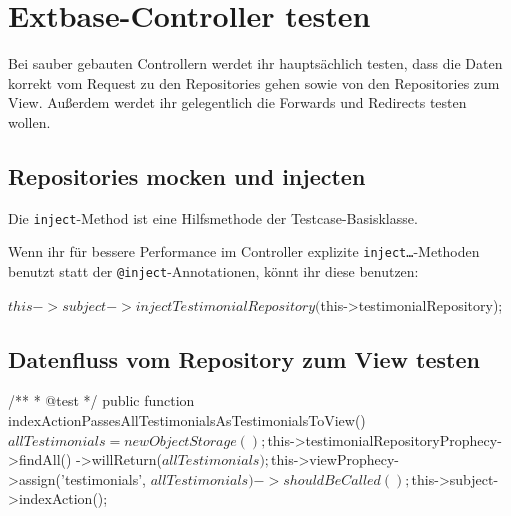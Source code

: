 \documentclass[a4paper,10pt,headsepline]{scrartcl}
\begin{document}
\pagebreak
\section{Extbase-Controller testen}

Bei sauber gebauten Controllern werdet ihr hauptsächlich testen, dass die Daten korrekt vom Request zu den Repositories gehen sowie von den Repositories zum View. Außerdem werdet ihr gelegentlich die Forwards und Redirects testen wollen.

\subsection{Repositories mocken und injecten}


Die \texttt{inject}-Method ist eine Hilfsmethode der Testcase-Basisklasse.

Wenn ihr für bessere Performance im Controller explizite \texttt{inject…}-Methoden benutzt statt der \texttt{@inject}-Annotationen, könnt ihr diese benutzen:

\begin{phpcode}
$this->subject->injectTestimonialRepository($this->testimonialRepository);
\end{phpcode}


\subsection{Datenfluss vom Repository zum View testen}

\begin{phpcode}
/**
  * @test
  */
public function indexActionPassesAllTestimonialsAsTestimonialsToView()
{
    $allTestimonials = new ObjectStorage();
    $this->testimonialRepositoryProphecy->findAll()
        ->willReturn($allTestimonials);

    $this->viewProphecy->assign('testimonials', $allTestimonials)
        ->shouldBeCalled();

    $this->subject->indexAction();
}
\end{phpcode}
\end{document}
